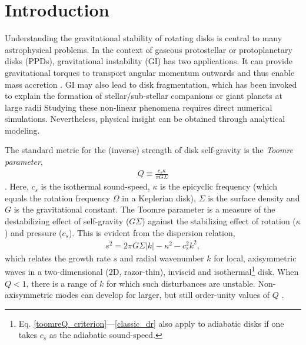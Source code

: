 \documentclass[iop, numberedappendix]{emulateapj}
\begin{document}
\section{Introduction}\label{intro} 
Understanding the gravitational stability of rotating disks    
is central to many astrophysical problems. In the context of 
gaseous protostellar or protoplanetary disks (PPDs), gravitational instability (GI)
has two applications. It can provide gravitational torques to
transport angular momentum outwards and thus enable mass accretion
\citep{armitage10,turner14}. GI may also lead to disk fragmentation,
which has been invoked to explain the formation of stellar/sub-stellar companions or 
giant planets 
at large radii \citep{boss97,kratter06,stam09,helled14} %
Studying these non-linear phenomena requires
direct numerical simulations. Nevertheless, physical insight can be    
obtained through analytical modeling. 

The standard metric for the (inverse) strength of disk self-gravity is
the \emph{Toomre parameter}, 
\begin{align}\label{toomreQ_criterion}
  Q \equiv \frac{c_s\kappa}{\pi G \Sigma}  
\end{align}
\citep{toomre64}. Here, $c_s$ is the isothermal sound-speed,
$\kappa$ is the epicyclic frequency (which equals the rotation
frequency $\Omega$ in a Keplerian disk), $\Sigma$ is the surface
density and $G$ is the gravitational constant. The Toomre parameter is a
measure of the destabilizing effect of self-gravity ($G\Sigma$) against 
the stabilizing effect of rotation ($\kappa$) and pressure 
($c_s$). This is evident from the dispersion relation, 
\begin{align}\label{classic_dr}
  s^2 =  2\pi G\Sigma|k| - \kappa^2 - c_s^2k^2,   
\end{align}
which relates the growth rate $s$ and radial wavenumber $k$ for local,
axisymmetric waves in a two-dimensional (2D, razor-thin), inviscid and
isothermal\footnote{Eq. \ref{toomreQ_criterion}---\ref{classic_dr} also apply to adiabatic disks if one takes $c_s$ as the adiabatic sound-speed.} disk.  
When $Q<1$, there is a range of $k$ for which such disturbances are
unstable.  
Non-axisymmetric modes can develop for larger, but still order-unity
values of $Q$ 
\citep{lau78,papaloizou89,papaloizou91}. 
\end{document}
